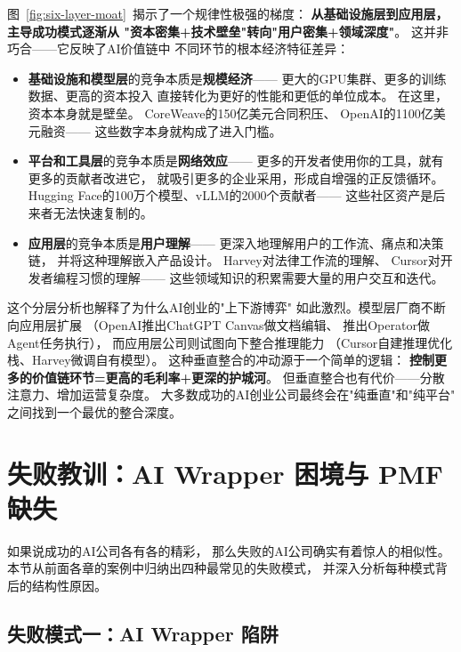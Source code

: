 图~\ref{fig:six-layer-moat}~揭示了一个规律性极强的梯度：
\textbf{从基础设施层到应用层，主导成功模式逐渐从
"资本密集+技术壁垒"转向"用户密集+领域深度"}。
这并非巧合——它反映了AI价值链中
不同环节的根本经济特征差异：

\begin{itemize}
  \item \textbf{基础设施和模型层}的竞争本质是\textbf{规模经济}——
    更大的GPU集群、更多的训练数据、更高的资本投入
    直接转化为更好的性能和更低的单位成本。
    在这里，资本本身就是壁垒。
    CoreWeave的150亿美元合同积压、
    OpenAI的1100亿美元融资——
    这些数字本身就构成了进入门槛。
  \item \textbf{平台和工具层}的竞争本质是\textbf{网络效应}——
    更多的开发者使用你的工具，就有更多的贡献者改进它，
    就吸引更多的企业采用，形成自增强的正反馈循环。
    Hugging Face的100万个模型、vLLM的2000个贡献者——
    这些社区资产是后来者无法快速复制的。
  \item \textbf{应用层}的竞争本质是\textbf{用户理解}——
    更深入地理解用户的工作流、痛点和决策链，
    并将这种理解嵌入产品设计。
    Harvey对法律工作流的理解、
    Cursor对开发者编程习惯的理解——
    这些领域知识的积累需要大量的用户交互和迭代。
\end{itemize}

这个分层分析也解释了为什么AI创业的"上下游博弈"
如此激烈。模型层厂商不断向应用层扩展
（OpenAI推出ChatGPT Canvas做文档编辑、
推出Operator做Agent任务执行），
而应用层公司则试图向下整合推理能力
（Cursor自建推理优化栈、Harvey微调自有模型）。
这种垂直整合的冲动源于一个简单的逻辑：
\textbf{控制更多的价值链环节=更高的毛利率+更深的护城河}。
但垂直整合也有代价——分散注意力、增加运营复杂度。
大多数成功的AI创业公司最终会在"纯垂直"和"纯平台"
之间找到一个最优的整合深度。


\section{失败教训：AI Wrapper 困境与 PMF 缺失}
\label{sec:patterns-failure}

如果说成功的AI公司各有各的精彩，
那么失败的AI公司确实有着惊人的相似性。
本节从前面各章的案例中归纳出四种最常见的失败模式，
并深入分析每种模式背后的结构性原因。

\subsection{失败模式一：AI Wrapper 陷阱}

